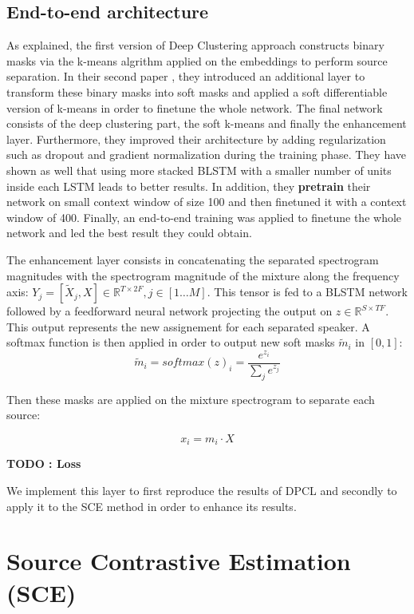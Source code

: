 \documentclass[master,final,11pt]{iscs-thesis}
\begin{document}
\subsection{End-to-end architecture}
\label{EEA}

As explained, the first version of Deep Clustering \cite{DPCLV1} approach constructs binary masks via the k-means algrithm applied on the embeddings to perform source separation. In their second paper \cite{DPCLV2}, they introduced an additional layer to transform these binary masks into soft masks and applied a soft differentiable version of k-means in order to finetune the whole network. The final network consists of the deep clustering part, the soft k-means and finally the enhancement layer.
Furthermore, they improved their architecture by adding regularization such as dropout and gradient normalization during the training phase. They have shown as well that using more stacked BLSTM with a smaller number of units inside each LSTM leads to better results.
In addition, they \textbf{pretrain} their network on small context window of size 100 and then finetuned it with a context window of 400. Finally, an end-to-end training was applied to finetune the whole network and led the best result they could obtain.

The enhancement layer consists in concatenating the separated spectrogram magnitudes with the spectrogram magnitude of the mixture along the frequency axis: $Y_j = [\tilde X_j, X] \in \mathbb{R}^{T\times 2F}, j \in [1\dots M]$.
 This tensor is fed to a BLSTM network followed by a feedforward neural network projecting the output on $z \in \mathbb{R}^{S\times TF}$. This output represents the new assignement for each separated speaker. A softmax function is then applied in order to output new soft masks $\tilde m_i$ in $[0,1]$:
\[
\tilde m_i = softmax(z)_i  = \frac{e^{z_i}}{\sum_j{e^{z_j}}} 
\]

Then these masks are applied on the mixture spectrogram to separate each source:

\[
x_i = m_i \cdot X
\]

\textbf{TODO : Loss}

We implement this layer to first reproduce the results of DPCL \cite{DPCLV2} and secondly to apply it to the SCE method in order to enhance its results.

\section{Source Contrastive Estimation (SCE)}
\end{document}
